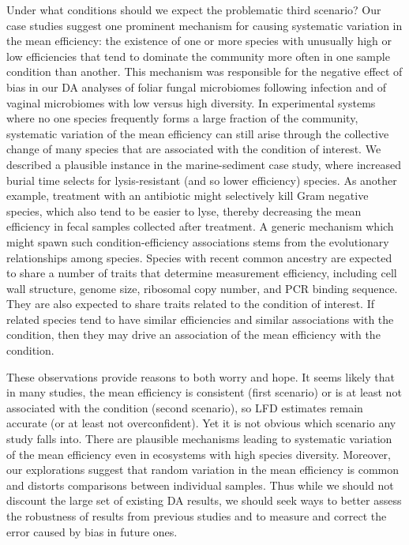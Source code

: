 \documentclass[
]{article}
\begin{document}
Under what conditions should we expect the problematic third scenario?
Our case studies suggest one prominent mechanism for causing systematic variation in the mean efficiency: the existence of one or more species with unusually high or low efficiencies that tend to dominate the community more often in one sample condition than another.
This mechanism was responsible for the negative effect of bias in our DA analyses of foliar fungal microbiomes following infection and of vaginal microbiomes with low versus high diversity.
In experimental systems where no one species frequently forms a large fraction of the community, systematic variation of the mean efficiency can still arise through the collective change of many species that are associated with the condition of interest.
We described a plausible instance in the marine-sediment case study, where increased burial time selects for lysis-resistant (and so lower efficiency) species.
As another example, treatment with an antibiotic might selectively kill Gram negative species, which also tend to be easier to lyse, thereby decreasing the mean efficiency in fecal samples collected after treatment.
A generic mechanism which might spawn such condition-efficiency associations stems from the evolutionary relationships among species.
Species with recent common ancestry are expected to share a number of traits that determine measurement efficiency, including cell wall structure, genome size, ribosomal copy number, and PCR binding sequence.
They are also expected to share traits related to the condition of interest.
If related species tend to have similar efficiencies and similar associations with the condition, then they may drive an association of the mean efficiency with the condition.

These observations provide reasons to both worry and hope.
It seems likely that in many studies, the mean efficiency is consistent (first scenario) or is at least not associated with the condition (second scenario), so LFD estimates remain accurate (or at least not overconfident).
Yet it is not obvious which scenario any study falls into.
There are plausible mechanisms leading to systematic variation of the mean efficiency even in ecosystems with high species diversity.
Moreover, our explorations suggest that random variation in the mean efficiency is common and distorts comparisons between individual samples.
Thus while we should not discount the large set of existing DA results, we should seek ways to better assess the robustness of results from previous studies and to measure and correct the error caused by bias in future ones.
\end{document}
